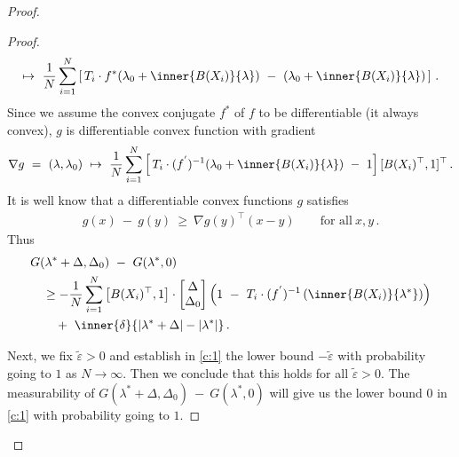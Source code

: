 \begin{proof}
\begin{proof}
\begin{gather}
    \mapsto
    \ 
    \frac{1}{N}
\sum_{i=1} 
  ^N
  \left[ 
    \,
  T_i
  \cdot
  f^*
  \!
  \left( 
\lambda_0
+
\inner
{B(X_i)}
{\lambda}
  \right)
  \ 
-
\ 
  \left( 
\lambda_0
+
\inner
{B(X_i)}
{\lambda}
  \right)
  \,
  \right]
  \,.
  \end{gather}
   Since we assume the convex conjugate $f^*$ of $f$ to be differentiable
   (it always convex),
   $g$ is differentiable convex function with gradient 
  \begin{gather*}
    \nabla
    g
    \ 
    =
    \ 
    (\lambda,\lambda_0)
    \ 
    \mapsto
    \ 
\frac{1}{N}
\sum_{i=1} 
  ^N
  \left[ 
    \,
  T_i
  \cdot
  (f^{'})^{-1}
  \!
  \left( 
\lambda_0
+
\inner
{B(X_i)}
{\lambda}
  \right)
  \ 
-
\ 
1
  \right]
  [
  B(X_i)^\top
  ,
  1
  ]^\top
  \,.
  \end{gather*}
It is well know that a differentiable convex functions $g$ satisfies
  \begin{gather*}
    g(x)
    \ 
    -
    \ 
    g(y)
    \ 
    \ge
    \ 
    \nabla
    g(y)^\top
    (x-y)
    \qquad 
    \text{for all}\ 
    x,y\,.
  \end{gather*}
Thus 
\begin{align}
  \label{c:1}
  \begin{split}
     &
   G
     (
     \lambda^*
      +
      \Delta
      ,
     \Delta_0
     )
     \ 
     -
     \ 
     G
     (
     \lambda^*,
     0
     )
     \\
     &
     \quad
     \ge
     -
     \frac{1}{N}
     \sum_{i=1}^{N} 
     \left[ 
       B(X_i)^\top,
       1
     \right]
     \cdot
     \begin{bmatrix}
       \Delta\\
       \Delta_0
     \end{bmatrix}
     \left( 
       1
       \ 
       -
       \ 
     T_i
     \cdot
     (f^{'})^{-1}
     \left( 
       \inner
       {B(X_i)}
       {\lambda^*}
     \right)
     \right)
     \\
     &
     \qquad
     +
     \ 
     \inner
     {\delta}
     {
       |\lambda^*+\Delta|
       -
       |\lambda^*|
     }
     \,.
   \end{split}
\end{align}

Next, we fix $
\tilde{\varepsilon}
>0
$
and establish in \eqref{c:1} the lower bound
$
-
\tilde{\varepsilon}
$
with probability going to $1$ as $N\to\infty$.
Then we conclude that this holds for all $\tilde{\varepsilon}>0$.
The measurability of
$
G
     (
     \lambda^*
      +
      \Delta
      ,
     \Delta_0
     )
     \ 
     -
     \ 
     G
     (
     \lambda^*,
     0
     )
$
will give us the lower bound 0 in \eqref{c:1} with probability going to $1$.


\end{proof}
\end{proof}
